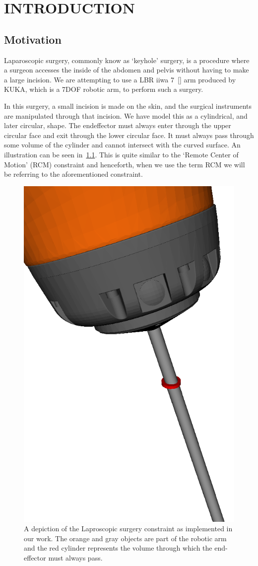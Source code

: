 \documentclass[BTech]{iitmdiss}
\begin{document}
    \chapter{INTRODUCTION}\label{ch:intro}


    \section{Motivation}\label{sec:motiv}
    Laparoscopic surgery, commonly know as `keyhole' surgery, is a procedure where a surgeon accesses the inside of
    the abdomen and pelvis without having to make a large incision.
    We are attempting to use a LBR iiwa 7~[\cite{AG}] arm produced by KUKA, which is a 7DOF robotic arm, to perform such a surgery.

    In this surgery, a small incision is made on the skin, and the surgical instruments are manipulated through that incision.
    We have model this as a cylindrical, and later circular, shape.
    The endeffector must always enter through the upper circular face and exit through the lower circular face.
    It must always pass through some volume of the cylinder and cannot intersect with the curved surface.
    An illustration can be seen in~\ref{fig:RCM}.
    This is quite similar to the `Remote Center of Motion' (RCM) constraint and henceforth, when we use the term RCM we will be referring to the aforementioned constraint.

    \begin{figure}
        \centering
        \includegraphics[height= 0.5\textwidth]{./img/rcm-constraint}
        \caption{A depiction of the Laproscopic surgery constraint as implemented in our work. The orange and gray objects are part of the robotic arm and the red cylinder represents the volume through which the end-effector must always pass.}
        \label{fig:RCM}
    \end{figure}
\end{document}
